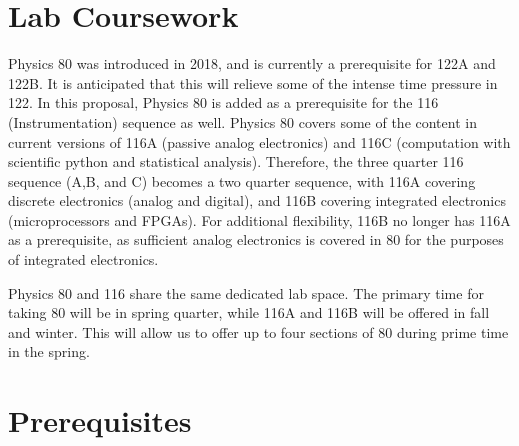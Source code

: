 \documentclass[12pt]{article}
\begin{document}
\section{Lab Coursework}

Physics 80 was introduced in 2018, and is currently a prerequisite for 122A and 122B.  It is anticipated that this will relieve some of the intense time pressure in 122.  In this proposal, Physics 80 is added as a prerequisite for the 116 (Instrumentation) sequence as well.  Physics 80 covers some of the content in current versions of 116A (passive analog electronics) and 116C (computation with scientific python and statistical analysis).  Therefore, the three quarter 116 sequence (A,B, and C) becomes a two quarter sequence, with 116A covering discrete electronics (analog and digital), and 116B covering integrated electronics (microprocessors and FPGAs).  For additional flexibility, 116B no longer has 116A as a prerequisite, as sufficient analog electronics is covered in 80 for the purposes of integrated electronics.  

Physics 80 and 116 share the same dedicated lab space.  The primary time for taking 80 will be in spring quarter, while 116A and 116B will be offered in fall and winter.  This will allow us to offer up to four sections of 80 during prime time in the spring.

\section{Prerequisites}
\end{document}
